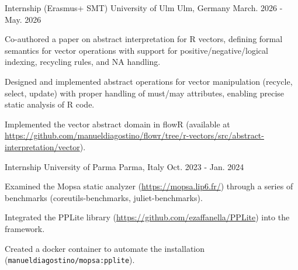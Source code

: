 
\begin{cventries}

  \cventry
  {Internship (Erasmus+ SMT)} %
  {University of Ulm} %
  {Ulm, Germany} %
  {March. 2026 - May. 2026} %
  {
    \begin{cvitems}
    \item {Co-authored a paper on abstract interpretation for R
        vectors, defining formal semantics for
        vector operations with support for positive/negative/logical
      indexing, recycling rules, and NA handling.}
    \item {Designed and implemented abstract operations for vector
        manipulation (recycle, select, update) with proper handling of
      must/may attributes, enabling precise static analysis of R code.}
    \item {Implemented the vector abstract domain in flowR (available
          at
      \url{https://github.com/manueldiagostino/flowr/tree/r-vectors/src/abstract-interpretation/vector}).}
    \end{cvitems}
  }

  \cventry
  {Internship} %
  {University of Parma} %
  {Parma, Italy} %
  {Oct. 2023 - Jan. 2024} %
  {
    \begin{cvitems} %
    \item {Examined the Mopsa static analyzer
        (\url{https://mopsa.lip6.fr/}) through a series of benchmarks
      (coreutils-benchmarks, juliet-benchmarks).}
    \item {Integrated the PPLite library
      (\url{https://github.com/ezaffanella/PPLite}) into the framework.}
    \item {Created a docker container to automate the installation
      (\texttt{manueldiagostino/mopsa:pplite}).}
    \end{cvitems}
  }

\end{cventries}
